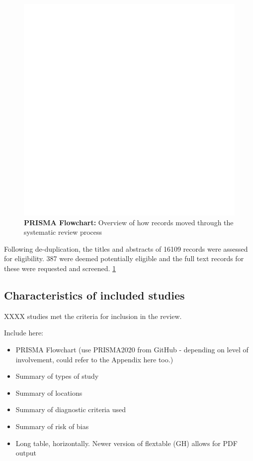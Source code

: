 \documentclass[a4paper, twoside]{templates/ociamthesis}
\begin{document}
\begin{figure}
\includegraphics[width=1\linewidth]{figures/sys-rev/prismaflow} \caption[PRISMA Flowchart]{\textbf{PRISMA Flowchart:} Overview of how records moved through the systematic review process}\label{fig:prisma-flow-fig}
\end{figure}

Following de-duplication, the titles and abstracts of 16109 records were assessed for eligibility. 387 were deemed potentially eligible and the full text records for these were requested and screened. \ref{fig:prisma-flow-fig}

\hypertarget{characteristics-of-included-studies}{%
\subsection{Characteristics of included studies}\label{characteristics-of-included-studies}}

XXXX studies met the criteria for inclusion in the review.

Include here:

\begin{itemize}
\item
  PRISMA Flowchart (use PRISMA2020 from GitHub - depending on level of involvement, could refer to the Appendix here too.)
\item
  Summary of types of study
\item
  Summary of locations
\item
  Summary of diagnostic criteria used
\item
  Summary of risk of bias
\item
  Long table, horizontally. Newer version of flextable (GH) allows for PDF output
\end{itemize}
\end{document}
